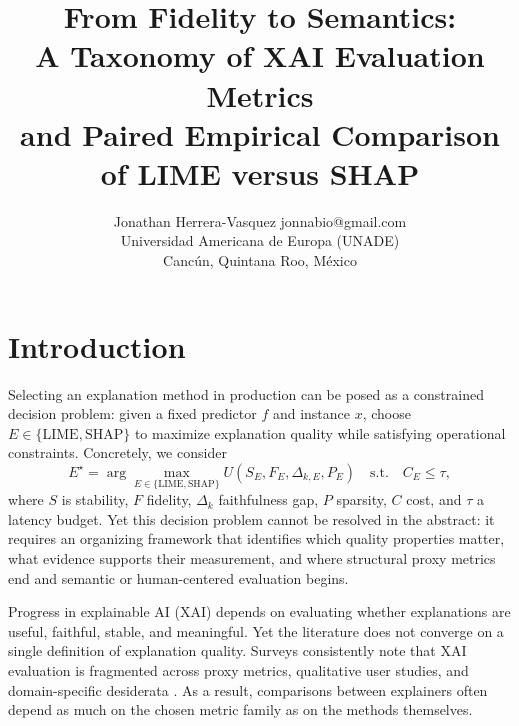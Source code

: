 \documentclass[twoside,11pt]{article}
\begin{document}
\title{From Fidelity to Semantics:\\
A Taxonomy of XAI Evaluation Metrics\\
and Paired Empirical Comparison of LIME versus SHAP}

\author{
\name Jonathan Herrera-Vasquez \email jonnabio@gmail.com \\
\addr Universidad Americana de Europa (UNADE)\\
Canc\'un, Quintana Roo, M\'exico
}

\editor{}

\maketitle

\begin{abstract}

\end{abstract}

\begin{keywords}

\end{keywords}

\section{Introduction}
\label{sec:intro}

Selecting an explanation method in production can be posed as a
constrained decision problem: given a fixed predictor $f$ and instance
$x$, choose $E \in \{\mathrm{LIME}, \mathrm{SHAP}\}$ to maximize
explanation quality while satisfying operational constraints. Concretely,
we consider
\[
E^\star = \arg\max_{E \in \{\mathrm{LIME},\mathrm{SHAP}\}}
U(S_E, F_E, \Delta_{k,E}, P_E)
\quad\text{s.t.}\quad C_E \le \tau,
\]
where $S$ is stability, $F$ fidelity, $\Delta_k$ faithfulness gap, $P$
sparsity, $C$ cost, and $\tau$ a latency budget. Yet this decision
problem cannot be resolved in the abstract: it requires an organizing
framework that identifies which quality properties matter, what evidence
supports their measurement, and where structural proxy metrics end and
semantic or human-centered evaluation begins.

Progress in explainable AI (XAI) depends on evaluating whether
explanations are useful, faithful, stable, and meaningful. Yet the
literature does not converge on a single definition of explanation
quality. Surveys consistently note that XAI evaluation is fragmented
across proxy metrics, qualitative user studies, and domain-specific
desiderata \citep{adadi2018xai,arrieta2020xai,kadir2023metrics,
canha2025benchmark}. As a result, comparisons between explainers often
depend as much on the chosen metric family as on the methods themselves.
\end{document}

